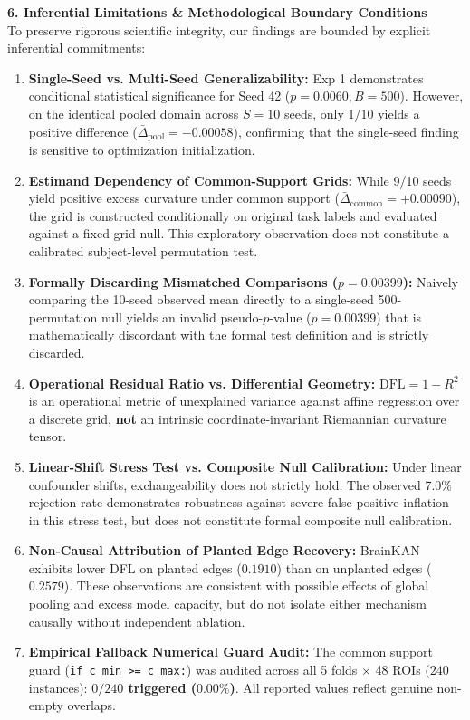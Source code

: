 \documentclass[9pt]{article}
\begin{document}
\textbf{\large 6. Inferential Limitations \& Methodological Boundary Conditions}\\[1pt]
To preserve rigorous scientific integrity, our findings are bounded by explicit inferential commitments:
\begin{enumerate}\itemsep -2.5pt
    \item \textbf{Single-Seed vs. Multi-Seed Generalizability:} Exp 1 demonstrates conditional statistical significance for Seed 42 ($p = 0.0060, B=500$). However, on the identical pooled domain across $S = 10$ seeds, only 1/10 yields a positive difference ($\bar{\Delta}_{\mathrm{pool}} = -0.00058$), confirming that the single-seed finding is sensitive to optimization initialization.
    \item \textbf{Estimand Dependency of Common-Support Grids:} While 9/10 seeds yield positive excess curvature under common support ($\bar{\Delta}_{\mathrm{common}} = +0.00090$), the grid is constructed conditionally on original task labels and evaluated against a fixed-grid null. This exploratory observation does not constitute a calibrated subject-level permutation test.
    \item \textbf{Formally Discarding Mismatched Comparisons ($p=0.00399$):} Naively comparing the 10-seed observed mean directly to a single-seed 500-permutation null yields an invalid pseudo-$p$-value ($p = 0.00399$) that is mathematically discordant with the formal test definition and is strictly discarded.
    \item \textbf{Operational Residual Ratio vs. Differential Geometry:} $\mathrm{DFL} = 1 - R^2$ is an operational metric of unexplained variance against affine regression over a discrete grid, \textbf{not} an intrinsic coordinate-invariant Riemannian curvature tensor.
    \item \textbf{Linear-Shift Stress Test vs. Composite Null Calibration:} Under linear confounder shifts, exchangeability does not strictly hold. The observed 7.0\% rejection rate demonstrates robustness against severe false-positive inflation in this stress test, but does not constitute formal composite null calibration.
    \item \textbf{Non-Causal Attribution of Planted Edge Recovery:} BrainKAN exhibits lower DFL on planted edges ($0.1910$) than on unplanted edges ($0.2579$). These observations are consistent with possible effects of global pooling and excess model capacity, but do not isolate either mechanism causally without independent ablation.
    \item \textbf{Empirical Fallback Numerical Guard Audit:} The common support guard (\texttt{if c\_min >= c\_max:}) was audited across all 5 folds $\times$ 48 ROIs ($240$ instances): \textbf{$0 / 240$ triggered ($0.00\%$)}. All reported values reflect genuine non-empty overlaps.
\end{enumerate}
\end{document}
